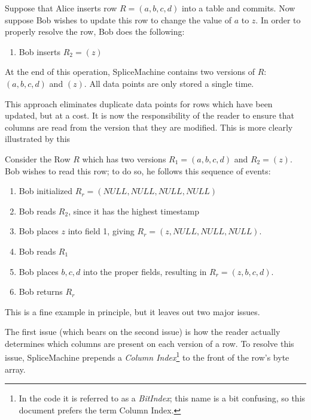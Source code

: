 \begin{exmp}
				Suppose that Alice inserts row $R = (a,b,c,d)$ into a table and commits. Now suppose Bob wishes to update this row to change the value of $a$ to $z$. In order to properly resolve the row, Bob does the following:

				\begin{enumerate}
								\item Bob inserts $R_2 = (z)$
				\end{enumerate}
				At the end of this operation, SpliceMachine contains two versions of $R$: $(a,b,c,d)$ and $(z)$. All data points are only stored a single time.
\end{exmp}

This approach eliminates duplicate data points for rows which have been updated, but at a cost. It is now the responsibility of the reader to ensure that columns are read from the version that they are modified. This is more clearly illustrated by this 

\begin{exmp}
				Consider the Row $R$ which has two versions $R_1 = (a,b,c,d)$ and $R_2 = (z)$. Bob wishes to read this row; to do so, he follows this sequence of events:

				\begin{enumerate}
								\item Bob initialized $R_r = (NULL,NULL,NULL,NULL)$
								\item Bob reads $R_2$, since it has the highest timestamp
								\item Bob places $z$ into field 1, giving $R_r = (z,NULL,NULL,NULL)$.
								\item Bob reads $R_1$
								\item Bob places $b,c,d$ into the proper fields, resulting in $R_r=(z,b,c,d)$.
								\item Bob returns $R_r$
				\end{enumerate}
\end{exmp}

This is a fine example in principle, but it leaves out two major issues.

The first issue (which bears on the second issue) is how the reader actually determines which columns are present on each version of a row. To resolve this issue, SpliceMachine prepends a \emph{Column Index}\footnote{In the code it is referred to as a \emph{BitIndex}; this name is a bit confusing, so this document prefers the term Column Index.} to the front of the row's byte array. 

